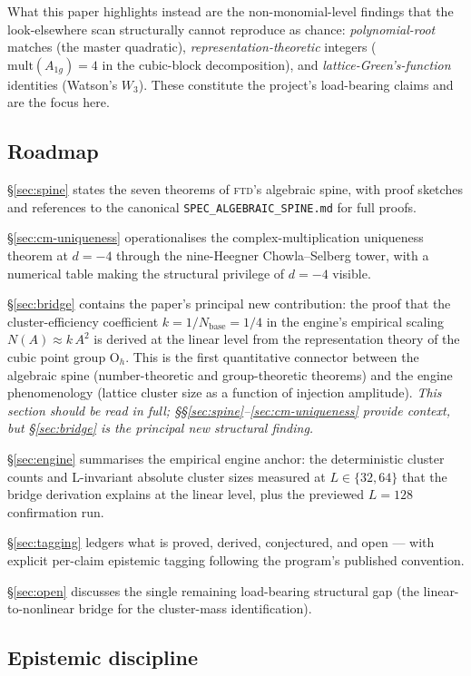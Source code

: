 \documentclass[11pt,reqno]{amsart}
\theoremstyle{plain}
\theoremstyle{definition}
\theoremstyle{remark}
\numberwithin{equation}{section}
\newcommand{\Ohgrp}{\mathrm{O}_h}
\newcommand{\Aoneg}{A_{1g}}
\newcommand{\Nbase}{N_{\mathrm{base}}}
\newcommand{\FTD}{\textsc{ftd}}
\begin{document}
What this paper highlights instead are the non-monomial-level
findings that the look-elsewhere scan structurally cannot reproduce
as chance: \emph{polynomial-root} matches (the master quadratic),
\emph{representation-theoretic} integers ($\mathrm{mult}(\Aoneg) = 4$
in the cubic-block decomposition), and \emph{lattice-Green's-function}
identities (Watson's $W_{3}$). These constitute the project's
load-bearing claims and are the focus here.

\subsection{Roadmap}

\S\ref{sec:spine} states the seven theorems of \FTD's algebraic
spine, with proof sketches and references to the canonical
\texttt{SPEC\_ALGEBRAIC\_SPINE.md} for full proofs.

\S\ref{sec:cm-uniqueness} operationalises the complex-multiplication
uniqueness theorem at $d=-4$ through the nine-Heegner Chowla--Selberg
tower, with a numerical table making the structural privilege of
$d=-4$ visible.

\S\ref{sec:bridge} contains the paper's principal new contribution:
the proof that the cluster-efficiency coefficient $k = 1/\Nbase = 1/4$
in the engine's empirical scaling $N(A) \approx k\,A^{2}$ is derived
at the linear level from the representation theory of the cubic point
group $\Ohgrp$. This is the first quantitative connector between the
algebraic spine (number-theoretic and group-theoretic theorems) and
the engine phenomenology (lattice cluster size as a function of
injection amplitude). \emph{This section should be read in full;
\S\S\ref{sec:spine}--\ref{sec:cm-uniqueness} provide context, but
\S\ref{sec:bridge} is the principal new structural finding.}

\S\ref{sec:engine} summarises the empirical engine anchor: the
deterministic cluster counts and L-invariant absolute cluster sizes
measured at $L \in \{32, 64\}$ that the bridge derivation explains
at the linear level, plus the previewed $L=128$ confirmation run.

\S\ref{sec:tagging} ledgers what is proved, derived, conjectured,
and open --- with explicit per-claim epistemic tagging following the
program's published convention.

\S\ref{sec:open} discusses the single remaining load-bearing
structural gap (the linear-to-nonlinear bridge for the cluster-mass
identification).

\subsection{Epistemic discipline}
\end{document}
